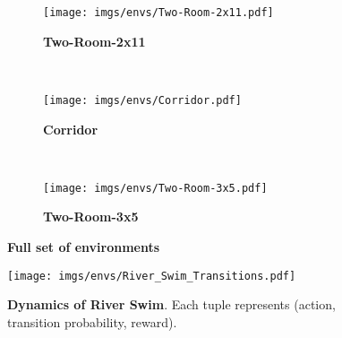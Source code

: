 \begin{figure}[tbh]
\begin{minipage}[b]{0.32\linewidth}
\begin{subfigure}[b]{\linewidth}
            \centering
            \caption*{\textbf{Two-Room-2x11}}
            \texttt{[image: imgs/envs/Two-Room-2x11.pdf]}
         \end{subfigure}
        \\
        \begin{subfigure}[b]{\linewidth}
            \centering
            \caption*{\textbf{Corridor}}
            \texttt{[image: imgs/envs/Corridor.pdf]}
         \end{subfigure}
        \\
         \begin{subfigure}[b]{\linewidth}
            \centering
            \caption*{\textbf{Two-Room-3x5}}
            \texttt{[image: imgs/envs/Two-Room-3x5.pdf]}
        \end{subfigure}
        \end{minipage}
    \caption{\textbf{Full set of environments}}
    \label{fig:envs}
    \end{figure}
%
%
%
\begin{figure}[tbh]
    \centering
    \texttt{[image: imgs/envs/River\_Swim\_Transitions.pdf]}
    \caption{\textbf{Dynamics of River Swim}. Each tuple represents (action, transition probability, reward).}
    \label{fig:river_swim_dynam}
\end{figure}
%
%
%
